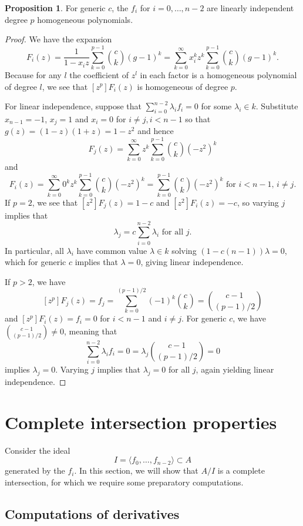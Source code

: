 \documentclass{amsart}
\numberwithin{equation}{section}
\theoremstyle{definition}
\newtheorem{proposition}[theorem]{Proposition}
\begin{document}
\begin{proposition}\label{prop:linind} 
For generic $c$, the $f_i$ for $i=0,\dots,n-2$ are linearly independent degree $p$ homogeneous polynomials.
\end{proposition} 
\begin{proof} 
We have the expansion
\[
F_i(z)=\frac{1}{1-x_iz}\sum_{k=0}^{p-1} \binom{c}{k} (g-1)^k=\sum_{k=0}^\infty x_i^kz^k\sum_{k=0}^{p-1} \binom{c}{k} (g-1)^k.
\]
Because for any $l$ the coefficient of $z^l$ in each factor is a homogeneous polynomial of degree $l$, we see that $[z^p]F_i(z)$ is homogeneous of degree $p$.

For linear independence, suppose that $\sum_{i=0}^{n-2} \lambda_if_i=0$ for some $\lambda_i \in k$.  Substitute $x_{n-1} = -1$, $x_j=1$ and $x_i=0$ for $i \ne j,i < n-1$ so that $g(z)=(1-z)(1+z)=1-z^2$ and hence
\[
F_j(z)=\sum_{k=0}^\infty z^k\sum_{k=0}^{p-1} \binom{c}{k} (-z^2)^k
\]
and 
\[
F_i(z)=\sum_{k=0}^\infty 0^kz^k\sum_{k=0}^{p-1} \binom{c}{k} (-z^2)^k=\sum_{k=0}^{p-1} \binom{c}{k} (-z^2)^k \text{ for $i < n - 1$, $i \neq j$}.
\]
If $p = 2$, we see that $[z^2]F_j(z)=1-c$ and $[z^2]F_i(z)=-c$, so varying $j$ implies that
\[
\lambda_j = c\sum_{i=0}^{n-2} \lambda_i \text{ for all }j.
\]
In particular, all $\lambda_i$ have common value $\lambda \in k$ solving $(1-c(n-1))\lambda = 0$, which for generic $c$ implies that $\lambda = 0$, giving linear independence.

If $p > 2$, we have 
\[
[z^p]F_j(z)=f_j=\sum_{k=0}^{(p-1)/2} (-1)^k\binom{c}{k}=\binom{c-1}{(p-1)/2}
\]
and $[z^p]F_i(z)=f_i=0$ for $i < n - 1$ and $i \neq j$. For generic $c$, we have $\binom{c-1}{(p-1)/2} \ne 0$, meaning that 
\[
\sum_{i=0}^{n-2} \lambda_if_i=0 = \lambda_j\binom{c-1}{(p-1)/2}=0
\]
implies $\lambda_j=0$.  Varying $j$ implies that $\lambda_j=0$ for all $j$, again yielding linear independence.
\end{proof}

\section{Complete intersection properties}

Consider the ideal
\[
I = \langle f_0, \ldots, f_{n - 2} \rangle \subset A
\]
generated by the $f_i$.  In this section, we will show that $A/I$ is a complete intersection, for which we require some preparatory computations.

\subsection{Computations of derivatives}
\end{document}
